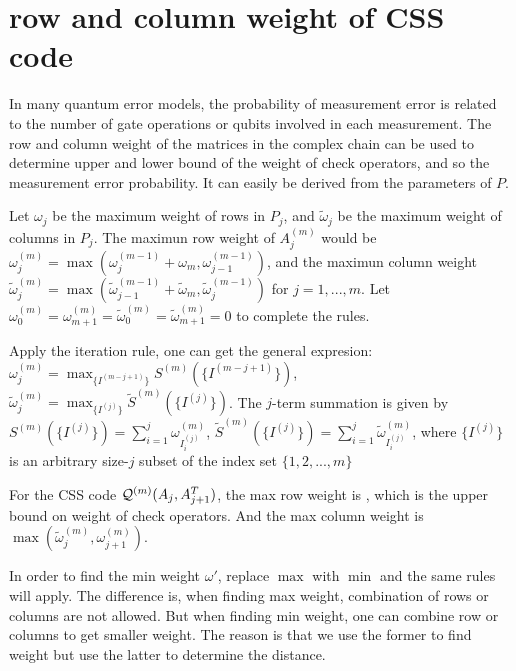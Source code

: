 \documentclass[aps,prb,12pt,tightenlines,%
notitlepage,longbibliography]{revtex4-1}
\begin{document}
\section{row and column weight of CSS code}
In many quantum error models, the probability of measurement error is related to the number of gate operations or qubits involved in each measurement. The row and column weight of the matrices in the complex chain can be used to determine upper and lower bound of the weight of check operators, and so the measurement error probability. It can easily be derived from the parameters of $P$.

Let $\omega_j$ be the maximum weight of rows in $P_j$, and $\tilde\omega_j$ be the maximum weight of columns in $P_j$. The maximun row weight of $A^{(m)}_j$ would be  $\omega^{(m)}_j=\max( \omega^{(m-1)}_j+\omega_m,\omega^{(m-1)}_{j-1})$, and the maximun column weight $\tilde\omega^{(m)}_j=\max( \tilde\omega^{(m-1)}_{j-1}+\tilde\omega_m,\tilde\omega^{(m-1)}_{j})$ for $j=1,...,m$. Let $\omega^{(m)}_0=\omega^{(m)}_{m+1}=\tilde\omega^{(m)}_0=\tilde\omega^{(m)}_{m+1}=0$ to complete the rules.

Apply the iteration rule, one can get the general expresion: $\displaystyle \omega^{(m)}_j=\max_{\{I^{(m-j+1)}\}} S^{(m)}(\{I^{(m-j+1)}\})$, 
$\displaystyle \tilde\omega^{(m)}_j=\max_{\{I^{(j)}\}} \tilde S^{(m)}(\{I^{(j)}\}) $. The $j$-term summation is given by $\displaystyle  S^{(m)}(\{I^{(j)}\}) = \sum_{i=1}^{j}  \omega^{(m)}_{I^{(j)}_i}$, $\displaystyle \tilde S^{(m)}(\{I^{(j)}\}) = \sum_{i=1}^{j} \tilde \omega^{(m)}_{I^{(j)}_i}$, where $\{I^{(j)}\}$ is an arbitrary size-$j$ subset of the index set $\{1,2,...,m\}$

For the CSS code $ {{\cal Q}^{(m)}}(A_{j},A_{j+1}^T)$, the max row weight is , which is the upper bound on weight of check operators. And the max column weight is $\max( \tilde\omega^{(m)}_j,  \omega^{(m)}_{j+1})$.

In order to find the min weight $\omega'$, replace $\max$ with $\min$ and the same rules will apply. The difference is, when finding max weight, combination of rows or columns are not allowed. But when finding min weight, one can combine row or columns to get smaller weight. The reason is that we use the former to find weight but use the latter to determine the distance.
\end{document}

